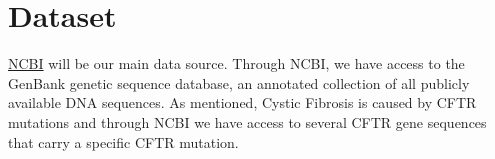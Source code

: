 \documentclass[10pt,twocolumn,letterpaper]{article}
\begin{document}
 \section{Dataset}
 {
    \href{https://www.ncbi.nlm.nih.gov/genbank/}{NCBI} will be our main data source. Through NCBI, we have access to the GenBank genetic sequence database,
     an annotated collection of all publicly available DNA sequences.
     As mentioned, Cystic Fibrosis is caused by CFTR mutations and through NCBI  we have access to several CFTR gene sequences that carry a specific CFTR mutation.
 }



 {\small
  
  
 }
\end{document}
